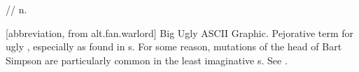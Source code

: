  // n.

[abbreviation, from alt.fan.warlord] Big Ugly ASCII Graphic. Pejorative term for
ugly , especially as found in s. For
some reason, mutations of the head of Bart Simpson are particularly common in
the least imaginative s. See .

